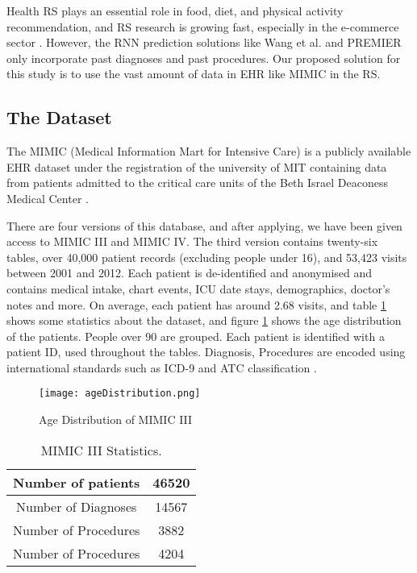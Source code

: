 Health RS plays an essential role in food, diet, and physical activity
recommendation, and RS research is growing fast, especially in the e-commerce
sector \cite{Tran2021b}. However, the RNN prediction solutions
like Wang et al. \cite{Wang} and PREMIER \cite{Bhoi2021} only incorporate past diagnoses and past
procedures. Our proposed solution for this study is to use the vast amount of
data in EHR like MIMIC in the RS. 

\subsection{
The Dataset 
}
The MIMIC (Medical Information Mart for Intensive Care) is a publicly
available EHR dataset under the registration of the university of MIT
containing data from patients admitted to the critical care units of the Beth
Israel Deaconess Medical Center \cite{Johnson2016}.

There are four versions of this database, and after applying, we have been
given access to MIMIC III and MIMIC IV. The third version contains twenty-six
tables, over 40,000 patient records (excluding people under 16), and 53,423
visits between 2001 and 2012. Each patient is de-identified and anonymised and
contains medical intake, chart events, ICU date stays, demographics, doctor's
notes and more. On average, each patient has around 2.68 visits, and table \ref{age}
shows some statistics about the dataset, and figure \ref{statistics} shows the age
distribution of the patients. People over 90 are grouped. Each patient is
identified with a patient ID, used throughout the tables. Diagnosis, Procedures
are encoded using international standards such as ICD-9 and ATC classification .

\begin{figure}[h]
    \texttt{[image: ageDistribution.png]}
    \caption{Age Distribution of MIMIC III}
    \label{age}
\end{figure}


\begin{table}[h]

    \caption{MIMIC III Statistics.}
    \label{statistics}
\begin{center}
\begin{tabular}{ | c | c | }
    \hline
 Number of patients     & 46520 \\ 
    \hline
 Number of Diagnoses    & 14567 \\  
    \hline
 Number of Procedures   & 3882 \\
    \hline
 Number of Procedures   & 4204  \\
    \hline
\end{tabular}
\end{center}

    \end{table}
